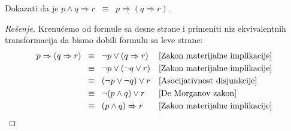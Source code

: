 % 
% 
% 
% 

\begin{EX}
  Dokazati da je $p \land q \Rightarrow r \;\;\equiv\;\; p \Rightarrow (q \Rightarrow r)$.
\end{EX}
\begin{proof}[Re\v senje]
  Krenu\'cemo od formule sa desne strane i primeniti niz ekvivalentnih transformacija da bismo dobili formulu sa leve strane:
  \begin{align*}
    p \Rightarrow (q \Rightarrow r)
    &\;\;\equiv\;\; \lnot p \lor (q \Rightarrow r) && \text{[Zakon materijalne implikacije]}\\
    &\;\;\equiv\;\; \lnot p \lor (\lnot q \lor r)  && \text{[Zakon materijalne implikacije]}\\
    &\;\;\equiv\;\; (\lnot p \lor \lnot q) \lor r  && \text{[Asocijativnost disjunkcije]}\\
    &\;\;\equiv\;\; \lnot(p \land q) \lor r        && \text{[De Morganov zakon]}\\
    &\;\;\equiv\;\; (p \land q) \Rightarrow r      && \text{[Zakon materijalne implikacije] }\qedhere
  \end{align*}
\end{proof}

